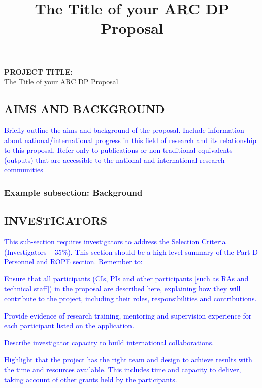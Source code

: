 \documentclass[12pt,a4paper]{article}
\date{}
\title{The Title of your ARC DP Proposal}
\date{} %
\newcommand{\rules}[1]{\textcolor{blue}{#1}}
\newcommand*{\TitleFont}{%
      \usefont{\encodingdefault}{\rmdefault}{b}{n}%
      \fontsize{12}{12}%
      \selectfont}
\begin{document}
\rmfamily
\date{}


\noindent \textbf{PROJECT TITLE: }\\ \noindent The Title of your ARC DP Proposal




\subsection*{\TitleFont AIMS AND BACKGROUND}
\rules{ Briefly outline the aims and background of the proposal.  Include information about national/international progress in this field of research and its relationship to this proposal. Refer only to publications or non-traditional equivalents (outputs) that are accessible to the national and international research communities }
\subsubsection*{Example subsection: Background}

\subsection*{\TitleFont INVESTIGATORS}
\rules{This sub-section requires investigators to address the Selection Criteria (Investigators – 35\%). This section should be a high level summary of the Part D Personnel and ROPE section. Remember to:}

\rules{Ensure that all participants (CIs, PIs and other participants [such as RAs and technical staff]) in the proposal are described here, explaining how they will contribute to the project, including their roles, responsibilities and contributions.}

\rules{Provide evidence of research training, mentoring and supervision experience for each participant listed on the application.}

\rules{Describe investigator capacity to build international collaborations.}

\rules{Highlight that the project has the right team and design to achieve results with the time and resources available. This includes time and capacity to deliver, taking account of other grants held by the participants.}
\end{document}
